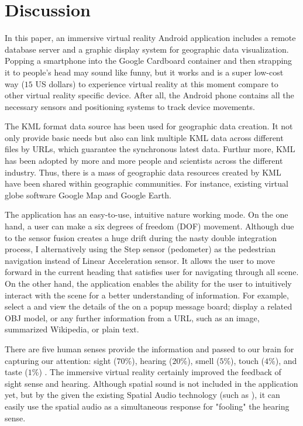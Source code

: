 \label{chapter-discussion}
\chapter{Discussion}

In this paper, an immersive virtual reality Android application includes a remote database server and a graphic display system for geographic data visualization. Popping a smartphone into the Google Cardboard container and then strapping it to people's head may sound like funny, but it works and is a super low-cost way ($15$ US dollars) to experience virtual reality at this moment compare to other virtual reality specific device. After all, the Android phone contains all the necessary sensors and positioning systems to track device movements.

The KML format data source has been used for geographic data creation. It not only provide basic needs but also can link multiple KML data across different files by URLs, which guarantee the synchronous latest data. Furthur more, KML has been adopted by more and more people and scientists across the different industry. Thus, there is a mass of geographic data resources created by KML have been shared within geographic communities. For instance, existing virtual globe software Google Map and Google Earth.

The application has an easy-to-use, intuitive nature working mode. On the one hand, a user can make a six degrees of freedom (DOF) movement. Although due to the sensor fusion creates a huge drift during the nasty double integration process, I alternatively using the Step sensor (pedometer) as the pedestrian navigation instead of Linear Acceleration sensor. It allows the user to move forward in the current heading that satisfies user for navigating through all scene. On the other hand, the application enables the ability for the user to intuitively interact with the scene for a better understanding of information. For example, select a  and view the details of the  on a popup message board; display a  related OBJ model, or any further information from a URL, such as an image, summarized Wikipedia, or plain text.

There are five human senses provide the information and passed to our brain for capturing our attention: sight ($70$\%), hearing ($20$\%), smell ($5$\%), touch ($4$\%), and taste ($1$\%) \cite{mazuryk.vr.1996}. The immersive virtual reality certainly improved the feedback of sight sense and hearing. Although spatial sound is not included in the application yet, but by the given the existing Spatial Audio technology (such as \cite{google.spatial-audio.2016}), it can easily use the spatial audio as a simultaneous response for "fooling" the hearing sense.

